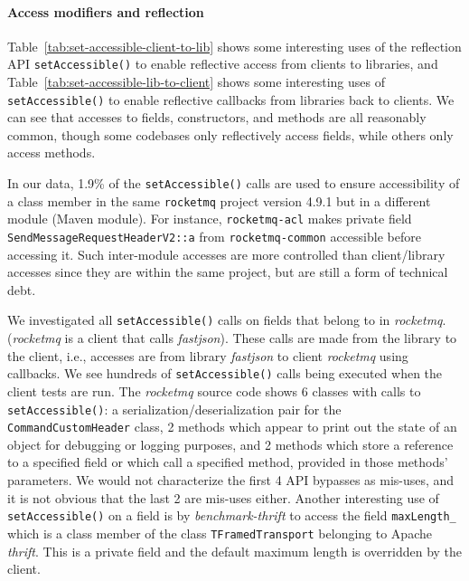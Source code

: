 \paragraph{Access modifiers and reflection}


Table~\ref{tab:set-accessible-client-to-lib}
shows some interesting uses of the reflection API \texttt{setAccessible()} to enable reflective access from clients to libraries,
and Table~\ref{tab:set-accessible-lib-to-client} shows  some interesting uses of \texttt{setAccessible()} to enable reflective callbacks from libraries back to clients.
We can see that accesses to fields, constructors, and methods are all reasonably common, though some codebases only reflectively 
access fields, while others only access methods.

In our data, 1.9\% of the \texttt{setAccessible()} calls are 
used to ensure accessibility of a class member
in the same \texttt{rocketmq} project version 4.9.1 but in a different module (Maven module). 
For instance, \texttt{rocketmq-acl} makes private field \texttt{SendMessageRequestHeaderV2::a} from 
\texttt{rocketmq-common} accessible before accessing it. Such inter-module accesses are more controlled than client/library accesses since they are within the same project,
but are still a form of technical debt.

We investigated all \texttt{setAccessible()} calls on fields that belong to in \emph{rocketmq}. (\emph{rocketmq} is a client that calls \emph{fastjson}). These calls are made from the library to the client, i.e., accesses are from library \emph{fastjson} to client \emph{rocketmq} using callbacks. We see hundreds of \texttt{setAccessible()} calls being executed when the client tests are run. The \emph{rocketmq} source code shows 6 classes with calls to \texttt{setAccessible()}: a serialization/deserialization pair for the \texttt{CommandCustomHeader} class, 2 methods which appear to print out the state of an object for debugging or logging purposes, and 2 methods which store a reference to a specified field or which call a specified method, provided in those methods' parameters. We would not characterize the first 4 API bypasses as mis-uses, and it is not obvious that the last 2 are mis-uses either. Another interesting use of \texttt{setAccessible()} on a field is by \emph{benchmark-thrift} to access the field \texttt{maxLength\_}  which is a class member of the class \texttt{TFramedTransport} belonging to Apache \emph{thrift}. This is a private field and the default maximum length is overridden by the client.

